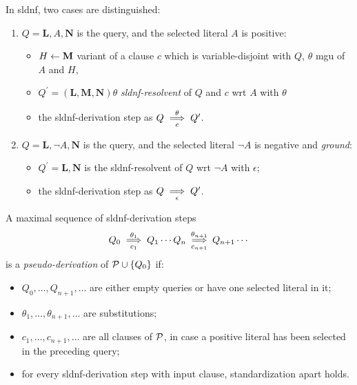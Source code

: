 \begin{dfn}
    In \gls{sldnf}, two cases are distinguished:
    \begin{enumerate}
        \item \(Q = \mathbf{L}, A, \mathbf{N}\) is the query, and the selected literal \(A\) is positive:
        \begin{itemize}
            \item \(H \leftarrow \mathbf{M}\) variant of a clause \(c\) which is variable-disjoint with \(Q\), \(\theta\) \gls{mgu} of \(A\) and \(H\),
            \item \(Q^\prime = (\mathbf{L},\mathbf{M},\mathbf{N})\theta\) \emph{\gls{sldnf}-resolvent} of \(Q\) and \(c\) wrt \(A\) with \(\theta\)
            \item the \gls{sldnf}-derivation step as \(Q \underset{c}{\overset{\theta}{\implies}} Q^\prime\).
        \end{itemize}
        \item \(Q = \mathbf{L}, \neg A, \mathbf{N}\) is the query, and the selected literal \(\neg A\) is negative and \emph{ground}:
        \begin{itemize}
            \item \(Q^\prime = \mathbf{L},\mathbf{N}\) is the \gls{sldnf}-resolvent of \(Q\) wrt \(\neg A\) with \(\epsilon\);
            \item the \gls{sldnf}-derivation step as \(Q \underset{\epsilon}{\overset{}{\implies}} Q^\prime\).
        \end{itemize}
    \end{enumerate}
\end{dfn}

\begin{dfn}
    A maximal sequence of \gls{sldnf}-derivation steps
    \begin{equation*}
        Q_0 \underset{c_1}{\overset{\theta_1}{\implies}} Q_1 \dotsb Q_n
        \underset{c_{n+1}}{\overset{\theta_{n+1}}{\implies}} Q_{n+1} \dotsb
    \end{equation*}
    is a \emph{pseudo-derivation} of \(\mathcal{P} \cup \lbrace Q_0 \rbrace\) if:
    \begin{itemize}
        \item \(Q_0,\dotsc,Q_{n+1},\dotsc\) are either empty queries or have one selected literal in it;
        \item \(\theta_1,\dotsc,\theta_{n+1},\dotsc\) are substitutions;
        \item \(c_1,\dotsc,c_{n+1},\dotsc\) are all clauses of \(\mathcal{P}\), in case a positive literal has been selected in the preceding query;
        \item for every \gls{sldnf}-derivation step with input clause, standardization apart holds.
    \end{itemize}
\end{dfn}

